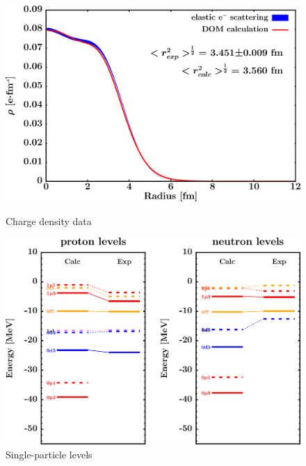 \begin{figure}[H]
    \centering
    \begin{minipage}{0.45\textwidth}
        \centering
        \includegraphics[width=1.0\textwidth]{figures/ca48_chargeDensity.png}
        \caption{Charge density data}
        \label{DOMFitData_ca48_chargeDensity}
    \end{minipage}\hfill
    \begin{minipage}{0.45\textwidth}
        \centering
        \includegraphics[width=1.0\textwidth]{figures/ca48_SPLevels.png}
        \caption{Single-particle levels}
        \label{DOMFitData_ca48_SPLevels}
    \end{minipage}
\end{figure}

\afterpage{\clearpage}


